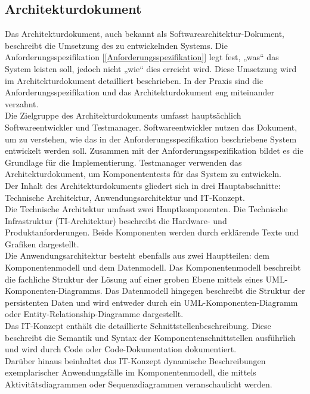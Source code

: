 \subsection{Architekturdokument}  \label{Architekturdokument}

Das Architekturdokument, auch bekannt als Softwarearchitektur-Dokument, beschreibt die Umsetzung des zu entwickelnden 
Systems. Die Anforderungsspezifikation [\ref{Anforderungsspezifikation}] legt fest, „was“ das System leisten soll, 
jedoch nicht „wie“ dies erreicht wird. Diese Umsetzung wird im Architekturdokument detailliert beschrieben. In der 
Praxis sind die Anforderungsspezifikation und das Architekturdokument eng miteinander verzahnt.\\

Die Zielgruppe des Architekturdokuments umfasst hauptsächlich Softwareentwickler und Testmanager. Softwareentwickler 
nutzen das Dokument, um zu verstehen, wie das in der Anforderungsspezifikation beschriebene System entwickelt werden 
soll. Zusammen mit der Anforderungsspezifikation bildet es die Grundlage für die Implementierung. Testmanager verwenden 
das Architekturdokument, um Komponententests für das System zu entwickeln.\\

Der Inhalt des Architekturdokuments gliedert sich in drei Hauptabschnitte: Technische Architektur, Anwendungsarchitektur 
und IT-Konzept.\\
Die Technische Architektur umfasst zwei Hauptkomponenten. Die Technische Infrastruktur (TI-Architektur) beschreibt 
die Hardware- und Produktanforderungen.
Beide Komponenten werden durch erklärende Texte und Grafiken dargestellt.\\
Die Anwendungsarchitektur besteht ebenfalls aus zwei Hauptteilen: dem Komponentenmodell und dem Datenmodell. Das 
Komponentenmodell beschreibt die fachliche Struktur der Lösung auf einer groben Ebene mittels eines 
UML-Komponenten-Diagramms. Das Datenmodell hingegen beschreibt die Struktur der persistenten Daten und wird 
entweder durch ein UML-Komponenten-Diagramm oder Entity-Relationship-Diagramme dargestellt.\\
Das IT-Konzept enthält die detaillierte Schnittstellenbeschreibung. Diese beschreibt die Semantik und Syntax der 
Komponentenschnittstellen ausführlich und wird durch Code oder Code-Dokumentation dokumentiert.\\ 
Darüber hinaus beinhaltet das IT-Konzept dynamische Beschreibungen exemplarischer Anwendungsfälle im Komponentenmodell, die mittels 
Aktivitätsdiagrammen oder Sequenzdiagrammen veranschaulicht werden.

